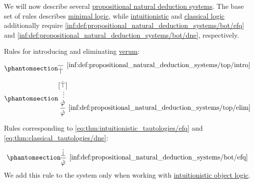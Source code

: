 \begin{definition}\label{def:propositional_natural_deduction_systems}
  We will now describe several \hyperref[def:abstract_natural_deduction_system]{propositional natural deduction systems}. The base set of rules describes \hyperref[con:minimal_logic]{minimal logic}, while \hyperref[con:intuitionistic_logic]{intuitionistic} and \hyperref[con:classical_logic]{classical logic} additionally require \ref{inf:def:propositional_natural_deduction_systems/bot/efq} and \ref{inf:def:propositional_natural_deduction_systems/bot/dne}, respectively.

  \begin{thmenum}
    \mimprovised Rules for introducing and eliminating \hyperref[def:propositional_alphabet/constants/verum]{verum}:
    \begin{paracol}{2}
      \begin{leftcolumn}
        \begin{equation*}\taglabel[\ensuremath{ \top^+ }]{inf:def:propositional_natural_deduction_systems/top/intro}
          \begin{prooftree}
            \infer0[\ref{inf:def:propositional_natural_deduction_systems/top/intro}]{ \syntop }
          \end{prooftree}
        \end{equation*}
      \end{leftcolumn}

      \begin{rightcolumn}
        \begin{equation*}\taglabel[\ensuremath{ \top^- }]{inf:def:propositional_natural_deduction_systems/top/elim}
          \begin{prooftree}
            \hypo{ [\syntop] }
            \ellipsis {} { \syn\varphi }
            \infer1[\ref{inf:def:propositional_natural_deduction_systems/top/elim}]{ \syn\varphi }
          \end{prooftree}
        \end{equation*}
      \end{rightcolumn}
    \end{paracol}

     Rules corresponding to \eqref{eq:thm:intuitionistic_tautologies/efq} and \eqref{eq:thm:classical_tautologies/dne}:
    \begin{paracol}{2}
      \begin{leftcolumn}
        \begin{equation*}\taglabel[\logic{EFQ}]{inf:def:propositional_natural_deduction_systems/bot/efq}
          \begin{prooftree}
            \hypo{ \synbot }
            \infer1[\ref{inf:def:propositional_natural_deduction_systems/bot/efq}]{ \syn\varphi }
          \end{prooftree}
        \end{equation*}
        We add this rule to the system only when working with \hyperref[con:intuitionistic_logic]{intuitionistic object logic}.
      \end{leftcolumn}


\end{paracol}
\end{thmenum}
\end{definition}
